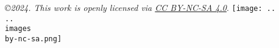 \emph{\copyright 2024. This work is openly licensed via \href{https://creativecommons.org/licenses/by-nc-sa/4.0/}{CC BY-NC-SA 4.0}}. \texttt{[image: ..\\..\\images\\by-nc-sa.png]}